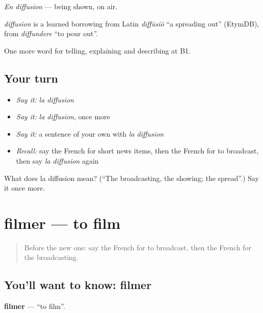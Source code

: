 \emph{En diffusion} — being shown, on air.

\begin{cousinweb}
\emph{diffusion} is a learned borrowing from Latin \emph{diffūsiō} \textquotedblleft{}a spreading out\textquotedblright{} (EtymDB), from \emph{diffundere} \textquotedblleft{}to pour out\textquotedblright{}.
\end{cousinweb}

\begin{grammarlens}[title={What you've built}]
One more word for telling, explaining and describing at B1.
\end{grammarlens}

\subsection*{Your turn}
\begin{itemize}
\raggedright
  \item \emph{Say it:} \emph{la diffusion}
  \item \emph{Say it:} \emph{la diffusion}, once more
  \item \emph{Say it:} a sentence of your own with \emph{la diffusion}
  \item \emph{Recall:} say the French for short news items, then the French for to broadcast, then say \emph{la diffusion} again
\end{itemize}

\begin{tcolorbox}[breakable,colback=teal!4,colframe=teal!35!black,title={Before you move on}]
What does la diffusion mean? (\textquotedblleft{}The broadcasting, the showing; the spread\textquotedblright{}.) Say it once more.
\end{tcolorbox}
\section[filmer]{filmer — to film}

\label{lesson:FR-C283-filmer}



\begin{quote}
Before the new one: say the French for to broadcast, then the French for the broadcasting.
\end{quote}

\subsection*{You'll want to know: filmer}
\textbf{filmer} — \textquotedblleft{}to film\textquotedblright{}.

